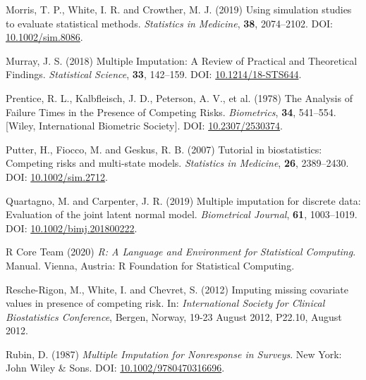 \documentclass[
  letterpaper,
  DIV=11,
  numbers=noendperiod]{scrreprt}
\newlength{\cslhangindent}
\newlength{\cslentryspacingunit} %
\newenvironment{CSLReferences}[2] %
 {%
  \setlength{\parindent}{0pt}
  \ifodd #1
  \let\oldpar\par
  \def\par{\hangindent=\cslhangindent\oldpar}
  \fi
  \setlength{\parskip}{#2\cslentryspacingunit}
 }%
 {}
\begin{document}
\begin{CSLReferences}{1}{0}
\leavevmode{}%
Morris, T. P., White, I. R. and Crowther, M. J. (2019) Using simulation
studies to evaluate statistical methods. \emph{Statistics in Medicine},
\textbf{38}, 2074--2102. DOI:
\href{https://doi.org/10.1002/sim.8086}{10.1002/sim.8086}.

\leavevmode{}%
Murray, J. S. (2018) Multiple {Imputation}: {A Review} of {Practical}
and {Theoretical Findings}. \emph{Statistical Science}, \textbf{33},
142--159. DOI:
\href{https://doi.org/10.1214/18-STS644}{10.1214/18-STS644}.

\leavevmode{}%
Prentice, R. L., Kalbfleisch, J. D., Peterson, A. V., et al. (1978) The
{Analysis} of {Failure Times} in the {Presence} of {Competing Risks}.
\emph{Biometrics}, \textbf{34}, 541--554. {[}Wiley, International
Biometric Society{]}. DOI:
\href{https://doi.org/10.2307/2530374}{10.2307/2530374}.

\leavevmode{}%
Putter, H., Fiocco, M. and Geskus, R. B. (2007) Tutorial in
biostatistics: Competing risks and multi-state models. \emph{Statistics
in Medicine}, \textbf{26}, 2389--2430. DOI:
\href{https://doi.org/10.1002/sim.2712}{10.1002/sim.2712}.

\leavevmode{}%
Quartagno, M. and Carpenter, J. R. (2019) Multiple imputation for
discrete data: {Evaluation} of the joint latent normal model.
\emph{Biometrical Journal}, \textbf{61}, 1003--1019. DOI:
\href{https://doi.org/10.1002/bimj.201800222}{10.1002/bimj.201800222}.

\leavevmode{}%
R Core Team (2020) \emph{R: {A} Language and Environment for Statistical
Computing}. Manual. Vienna, Austria: R Foundation for Statistical
Computing.

\leavevmode{}%
Resche-Rigon, M., White, I. and Chevret, S. (2012) Imputing missing
covariate values in presence of competing risk. In: \emph{International
{Society} for {Clinical Biostatistics Conference}}, Bergen, Norway,
19-23 August 2012, P22.10, August 2012.

\leavevmode{}%
Rubin, D. (1987) \emph{Multiple Imputation for Nonresponse in Surveys}.
New York: John Wiley \& Sons. DOI:
\href{https://doi.org/10.1002/9780470316696}{10.1002/9780470316696}.


\end{CSLReferences}
\end{document}
